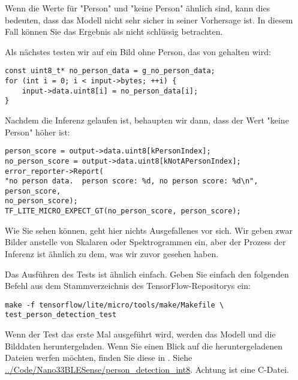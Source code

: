 Wenn die Werte für "Person" und "keine Person" ähnlich sind, kann dies bedeuten, dass das Modell nicht sehr sicher in seiner Vorhersage ist. In diesem Fall können Sie das Ergebnis als nicht schlüssig betrachten.

Als nächstes testen wir auf ein Bild ohne Person, das von  gehalten wird:


\begin{code}
    \begin{lstlisting}
const uint8_t* no_person_data = g_no_person_data;
for (int i = 0; i < input->bytes; ++i) {
    input->data.uint8[i] = no_person_data[i];
}
  \end{lstlisting}
\end{code}


Nachdem die Inferenz gelaufen ist, behaupten wir dann, dass der Wert "keine Person" höher ist:

\begin{code}
    \begin{lstlisting}
person_score = output->data.uint8[kPersonIndex];
no_person_score = output->data.uint8[kNotAPersonIndex];
error_reporter->Report(
"no person data.  person score: %d, no person score: %d\n", person_score,
no_person_score);
TF_LITE_MICRO_EXPECT_GT(no_person_score, person_score);
  \end{lstlisting}
\end{code}

Wie Sie sehen können, geht hier nichts Ausgefallenes vor sich. Wir geben zwar Bilder anstelle von Skalaren oder Spektrogrammen ein, aber der Prozess der Inferenz ist ähnlich zu dem, was wir zuvor gesehen haben.

Das Ausführen des Tests ist ähnlich einfach. Geben Sie einfach den folgenden Befehl aus dem Stammverzeichnis des TensorFlow-Repositorys ein:

\begin{code}
    \begin{lstlisting}
make -f tensorflow/lite/micro/tools/make/Makefile \
test_person_detection_test
  \end{lstlisting}
\end{code}

Wenn der Test das erste Mal ausgeführt wird, werden das Modell und die Bilddaten heruntergeladen. Wenn Sie einen Blick auf die heruntergeladenen Dateien werfen möchten, finden Sie diese in . Siehe \url{../Code/Nano33BLESense/person_detection_int8}. Achtung ist eine C-Datei.

